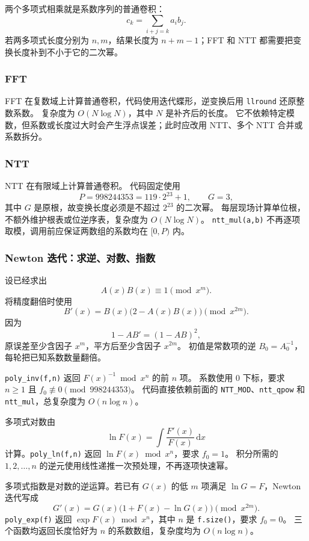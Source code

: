 两个多项式相乘就是系数序列的普通卷积：
\[
  c_k=\sum_{i+j=k}a_i b_j.
\]
若两多项式长度分别为 $n,m$，结果长度为 $n+m-1$；FFT 和 NTT 都需要把变换长度补到不小于它的二次幂。

\subsubsection{FFT}

FFT 在复数域上计算普通卷积，代码使用迭代蝶形，逆变换后用 \texttt{llround} 还原整数系数。
复杂度为 $O(N\log N)$，其中 $N$ 是补齐后的长度。
它不依赖特定模数，但系数或长度过大时会产生浮点误差；此时应改用 NTT、多个 NTT 合并或系数拆分。

\subsubsection{NTT}

NTT 在有限域上计算普通卷积。
代码固定使用
\[
  P=998244353=119\cdot2^{23}+1,
  \qquad G=3,
\]
其中 $G$ 是原根，故变换长度必须是不超过 $2^{23}$ 的二次幂。
每层现场计算单位根，不额外维护根表或位逆序表，复杂度为 $O(N\log N)$。
\texttt{ntt\_mul(a,b)} 不再逐项取模，调用前应保证两数组的系数均在 $[0,P)$ 内。

\subsubsection{Newton 迭代：求逆、对数、指数}

设已经求出
\[
  A(x)B(x)\equiv1\pmod{x^m}.
\]
将精度翻倍时使用
\[
  B'(x)=B(x)\bigl(2-A(x)B(x)\bigr)\pmod{x^{2m}}.
\]
因为
\[
  1-A B'=(1-A B)^2,
\]
原误差至少含因子 $x^m$，平方后至少含因子 $x^{2m}$。
初值是常数项的逆 $B_0=A_0^{-1}$，每轮把已知系数数量翻倍。

\texttt{poly\_inv(f,n)} 返回 $F(x)^{-1}\bmod x^n$ 的前 $n$ 项。
系数使用 $0$ 下标，要求 $n\ge1$ 且 $f_0\not\equiv0\pmod{998244353}$。
代码直接依赖前面的 \texttt{NTT\_MOD}、\texttt{ntt\_qpow} 和 \texttt{ntt\_mul}，总复杂度为 $O(n\log n)$。

多项式对数由
\[
  \ln F(x)=\int\frac{F'(x)}{F(x)}\,\mathrm dx
\]
计算。\texttt{poly\_ln(f,n)} 返回 $\ln F(x)\bmod x^n$，要求 $f_0=1$。
积分所需的 $1,2,\ldots,n$ 的逆元使用线性递推一次预处理，不再逐项快速幂。

多项式指数是对数的逆运算。若已有 $G(x)$ 的低 $m$ 项满足 $\ln G=F$，Newton 迭代写成
\[
  G'(x)=G(x)\bigl(1+F(x)-\ln G(x)\bigr)\pmod{x^{2m}}.
\]
\texttt{poly\_exp(f)} 返回 $\exp F(x)\bmod x^n$，其中 $n$ 是 \texttt{f.size()}，要求 $f_0=0$。
三个函数均返回长度恰好为 $n$ 的系数数组，复杂度均为 $O(n\log n)$。

